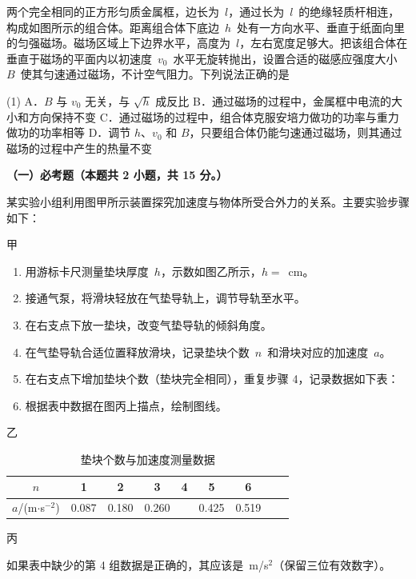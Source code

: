 \begin{question}
两个完全相同的正方形匀质金属框，边长为~$l$，通过长为~$l$~的绝缘轻质杆相连，构成如图所示的组合体。距离组合体下底边~$h$~处有一方向水平、垂直于纸面向里的匀强磁场。磁场区域上下边界水平，高度为~$l$，左右宽度足够大。把该组合体在垂直于磁场的平面内以初速度~$v_{0}$~水平无旋转抛出，设置合适的磁感应强度大小~$B$~使其匀速通过磁场，不计空气阻力。下列说法正确的是\gkblank


\begin{gkopts}(1)
  \task A．$B$ 与 $v_{0}$ 无关，与 $\sqrt{h}$ 成反比
  \task B．通过磁场的过程中，金属框中电流的大小和方向保持不变
  \task C．通过磁场的过程中，组合体克服安培力做功的功率与重力做功的功率相等
  \task D．调节 $h$、$v_{0}$ 和 $B$，只要组合体仍能匀速通过磁场，则其通过磁场的过程中产生的热量不变
\end{gkopts}
\end{question}


\textbf{（一）必考题（本题共 2 小题，共 15 分。）}

\begin{question}
某实验小组利用图甲所示装置探究加速度与物体所受合外力的关系。主要实验步骤如下：


甲

\begin{enumerate}[leftmargin=2em]
  \item 用游标卡尺测量垫块厚度~$h$，示数如图乙所示，$h=$\gkblank~cm。
  \item 接通气泵，将滑块轻放在气垫导轨上，调节导轨至水平。
  \item 在右支点下放一垫块，改变气垫导轨的倾斜角度。
  \item 在气垫导轨合适位置释放滑块，记录垫块个数~$n$~和滑块对应的加速度~$a$。
  \item 在右支点下增加垫块个数（垫块完全相同），重复步骤 4，记录数据如下表：
  \item 根据表中数据在图丙上描点，绘制图线。
\end{enumerate}


乙

\begin{table}[ht]
\centering
\caption{垫块个数与加速度测量数据}
\small
\begin{tabular}{ccccccccc}
\toprule
$n$ & 1 & 2 & 3 & 4 & 5 & 6\\
\midrule
$a$/(m$\cdot$s$^{-2}$) & 0.087 & 0.180 & 0.260 &  & 0.425 & 0.519\\
\bottomrule
\end{tabular}
\end{table}


丙

如果表中缺少的第 4 组数据是正确的，其应该是\gkblank~m/s$^{2}$（保留三位有效数字）。
\end{question}

